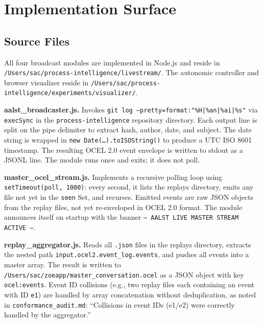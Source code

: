 
\section{Implementation Surface}
\label{sec:livestream-impl}

\subsection{Source Files}
\label{sec:livestream-impl-sources}

All four broadcast modules are implemented in Node.js and reside in
\texttt{/Users/sac/process-intelligence/livestream/}. The autonomic controller and
browser visualizer reside in
\texttt{/Users/sac/process-intelligence/experiments/visualizer/}.

\textbf{aalst\_broadcaster.js.} Invokes \texttt{git log --pretty=format:"\%H|\%an|\%ai|\%s"}
via \texttt{execSync} in the \texttt{process-intelligence} repository directory.
Each output line is split on the pipe delimiter to extract hash, author, date, and
subject. The date string is wrapped in \texttt{new Date(\ldots).toISOString()} to
produce a UTC ISO 8601 timestamp. The resulting OCEL 2.0 event envelope is written
to stdout as a JSONL line. The module runs once and exits; it does not poll.

\textbf{master\_ocel\_stream.js.} Implements a recursive polling loop using
\texttt{setTimeout(poll, 1000)}: every second, it lists the replays directory, emits
any file not yet in the \texttt{seen} Set, and recurses. Emitted events are raw JSON
objects from the replay files, not yet re-enveloped in OCEL 2.0 format. The module
announces itself on startup with the banner
\texttt{--- AALST LIVE MASTER STREAM ACTIVE ---}.

\textbf{replay\_aggregator.js.} Reads all \texttt{.json} files in the replays
directory, extracts the nested path \texttt{input.ocel2.event\_log.events}, and
pushes all events into a master array. The result is written to
\texttt{/Users/sac/zoeapp/master\_conversation.ocel} as a JSON object with key
\texttt{ocel:events}. Event ID collisions (e.g., two replay files each containing
an event with ID \texttt{e1}) are handled by array concatenation without deduplication,
as noted in \texttt{conformance\_audit.md}: ``Collisions in event IDs (e1/e2) were
correctly handled by the aggregator.''

